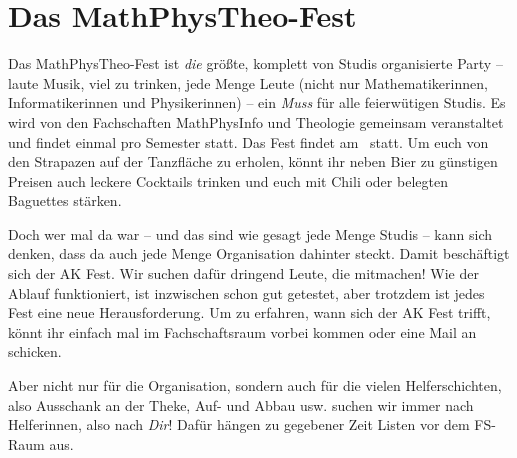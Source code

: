 \section{Das MathPhysTheo-Fest}

Das MathPhysTheo-Fest ist \emph{die} größte, komplett von Studis organisierte Party -- laute Musik, viel zu trinken, jede Menge Leute (nicht nur Mathematikerinnen, Informatikerinnen und Physikerinnen) -- ein \emph{Muss} für alle feierwütigen Studis. Es wird von den Fachschaften MathPhysInfo und Theologie gemeinsam veranstaltet und findet einmal pro Semester statt. Das Fest findet am \mathphystheotermin\ statt. Um euch von den Strapazen auf der Tanzfläche zu erholen, könnt ihr neben Bier zu günstigen Preisen auch leckere Cocktails trinken und euch mit Chili oder belegten Baguettes stärken.

Doch wer mal da war -- und das sind wie gesagt jede Menge Studis -- kann sich denken, dass da auch jede Menge Organisation dahinter steckt. Damit beschäftigt sich der AK Fest. Wir suchen dafür dringend Leute, die mitmachen! Wie der Ablauf funktioniert, ist inzwischen schon gut getestet, aber trotzdem ist jedes Fest eine neue Herausforderung. Um zu erfahren, wann sich der AK Fest trifft, könnt ihr einfach mal im Fachschaftsraum vorbei kommen oder eine Mail an  schicken.

Aber nicht nur für die Organisation, sondern auch für die vielen Helferschichten, also Ausschank an der Theke, Auf- und Abbau usw. suchen wir immer nach Helferinnen, also nach \emph{Dir}! Dafür hängen zu gegebener Zeit Listen vor dem FS-Raum aus.

